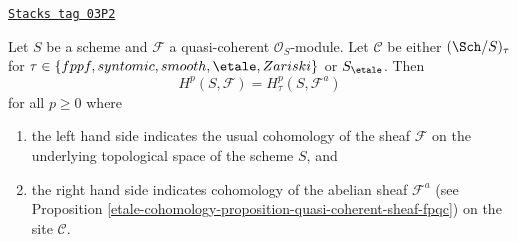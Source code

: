 \begin{theorem}
\label{etale-cohomology-theorem-zariski-fpqc-quasi-coherent}
\href{https://stacks.math.columbia.edu/tag/03P2}{\texttt{Stacks tag 03P2}}

Let $S$ be a scheme and $\mathcal{F}$ a quasi-coherent $\mathcal{O}_S$-module.
Let $\mathcal{C}$ be either $(\Sch/S)_\tau$ for
$\tau \in \{fppf, syntomic, smooth, \etale, Zariski\}$ or
$S_\etale$. Then
$$
H^p(S, \mathcal{F}) = H^p_\tau(S, \mathcal{F}^a)
$$
for all $p \geq 0$ where
\begin{enumerate}
\item the left hand side indicates the usual cohomology of the sheaf
$\mathcal{F}$ on the underlying topological space of the scheme $S$, and
\item the right hand side indicates cohomology
of the abelian sheaf $\mathcal{F}^a$ (see
Proposition \ref{etale-cohomology-proposition-quasi-coherent-sheaf-fpqc})
on the site $\mathcal{C}$.
\end{enumerate}
\end{theorem}

